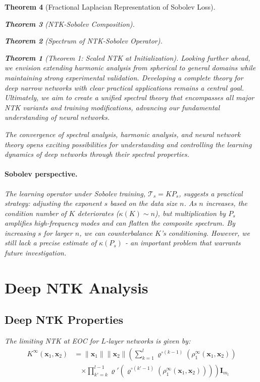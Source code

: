 \documentclass{article}
\newtheorem{theorem}{Theorem}[section]
\begin{document}
\begin{theorem}[Fractional Laplacian Representation of Sobolev Loss]
\begin{theorem}[NTK-Sobolev Composition]
\begin{theorem}[Spectrum of NTK-Sobolev Operator]
\begin{theorem}[Theorem 1: Scaled NTK at Initialization]
Looking further ahead, we envision extending harmonic analysis from spherical to general domains while maintaining strong experimental validation. Developing a complete theory for deep narrow networks with clear practical applications remains a central goal. Ultimately, we aim to create a unified spectral theory that encompasses all major NTK variants and training modifications, advancing our fundamental understanding of neural networks.

The convergence of spectral analysis, harmonic analysis, and neural network theory opens exciting possibilities for understanding and controlling the learning dynamics of deep networks through their spectral properties.

\paragraph{Sobolev perspective.} The learning operator under Sobolev training, $\mathcal T_s = KP_s$, suggests a practical strategy: adjusting the exponent $s$ based on the data size $n$. As $n$ increases, the condition number of $K$ deteriorates ($\kappa(K)\sim n$), but multiplication by $P_s$ amplifies high-frequency modes and can flatten the composite spectrum. By increasing $s$ for larger $n$, we can counterbalance $K$'s conditioning. However, we still lack a precise estimate of $\kappa(P_s)$ - an important problem that warrants future investigation.

\newpage

\section{Deep NTK Analysis}

\subsection{Deep NTK Properties}

The limiting NTK at EOC for $L$-layer networks is given by:
\begin{align}
K^{\infty}(\mathbf{x}_1, \mathbf{x}_2) &= \|\mathbf{x}_1\| \|\mathbf{x}_2\| \left( \sum_{k=1}^l \varrho^{\circ (k-1)}\left(\rho_1^{\infty}(\mathbf{x}_1, \mathbf{x}_2)\right) \right. \\
&\quad \left. \times \prod_{k'=k}^{l-1} \varrho'\left(\varrho^{\circ (k'-1)}\left(\rho_1^{\infty}(\mathbf{x}_1, \mathbf{x}_2)\right)\right) \right) \mathbf{I}_{m_l}
\end{align}


\end{theorem}
\end{theorem}
\end{theorem}
\end{theorem}
\end{document}

